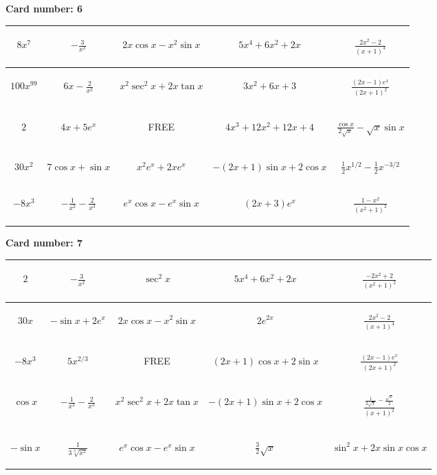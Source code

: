 \documentclass{article}
\newcommand{\entry}[1]{\begin{minipage}[t][2.75cm][t]{4cm} \vspace{1cm} \begin{center}#1\end{center} \end{minipage}}
\newcommand{\freespace}{\entry{FREE}}
\newcommand{\cardnumber}[1]{\noindent \textbf{Card number: #1} \bigskip}
\begin{document}
\pagebreak

\cardnumber{6}
\begin{center}
\begin{tabular}{|*{5}{c|}}
    \hline
    \entry{$8x^7$} & \entry{$-\frac{3}{x^2}$} & \entry{$2x \cos x - x^2 \sin x$} & \entry{$5x^4 + 6x^2 + 2x$} & \entry{$\frac{2x^2 - 2}{(x + 1)^4}$} \\ \hline
    \entry{$100x^{99}$} & \entry{$6x - \frac{2}{x^2}$} & \entry{$x^2 \sec^2 x + 2x \tan x$} & \entry{$3x^2 + 6x + 3$} & \entry{$\frac{(2x - 1) e^x}{(2x + 1)^2}$} \\ \hline
    \entry{$2$} & \entry{$4x + 5e^x$} & \freespace & \entry{$4x^3 + 12x^2 + 12x + 4$} & \entry{$\frac{\cos x}{2 \sqrt{x}} - \sqrt{x} \sin x$} \\ \hline
    \entry{$30x^2$} & \entry{$7 \cos x + \sin x$} & \entry{$x^2 e^x + 2x e^x$} & \entry{$-(2x + 1) \sin x + 2 \cos x$} & \entry{$\frac{1}{2} x^{1/2} - \frac{1}{2} x^{-3/2}$} \\ \hline
    \entry{$-8x^3$} & \entry{$-\frac{1}{x^2} - \frac{2}{x^3}$} & \entry{$e^x \cos x - e^x \sin x$} & \entry{$(2x + 3) e^x$} & \entry{$\frac{1 - x^2}{(x^2 + 1)^2}$} \\ \hline
\end{tabular}
\end{center}

\pagebreak

\cardnumber{7}
\begin{center}
\begin{tabular}{|*{5}{c|}}
    \hline
    \entry{$2$} & \entry{$-\frac{3}{x^2}$} & \entry{$\sec^2 x$} & \entry{$5x^4 + 6x^2 + 2x$} & \entry{$\frac{-2x^2 + 2}{(x^2 + 1)^2}$} \\ \hline
    \entry{$30x$} & \entry{$-\sin x + 2e^x$} & \entry{$2x \cos x - x^2 \sin x$} & \entry{$2e^{2x}$} & \entry{$\frac{2x^2 - 2}{(x + 1)^4}$} \\ \hline
    \entry{$-8x^3$} & \entry{$5x^{2/3}$} & \freespace & \entry{$(2x + 1) \cos x + 2 \sin x$} & \entry{$\frac{(2x - 1) e^x}{(2x + 1)^2}$} \\ \hline
    \entry{$\cos x$} & \entry{$-\frac{1}{x^2} - \frac{2}{x^3}$} & \entry{$x^2 \sec^2 x + 2x \tan x$} & \entry{$-(2x + 1) \sin x + 2 \cos x$} & \entry{$\frac{\frac{1}{2 \sqrt{x}} - \frac{\sqrt{x}}{2}}{(x + 1)^2}$} \\ \hline
    \entry{$-\sin x$} & \entry{$\frac{1}{3\sqrt[3]{x^2}}$} & \entry{$e^x \cos x - e^x \sin x$} & \entry{$\frac{3}{2} \sqrt{x}$} & \entry{$\sin^2 x + 2x \sin x \cos x$} \\ \hline
\end{tabular}
\end{center}
\end{document}
